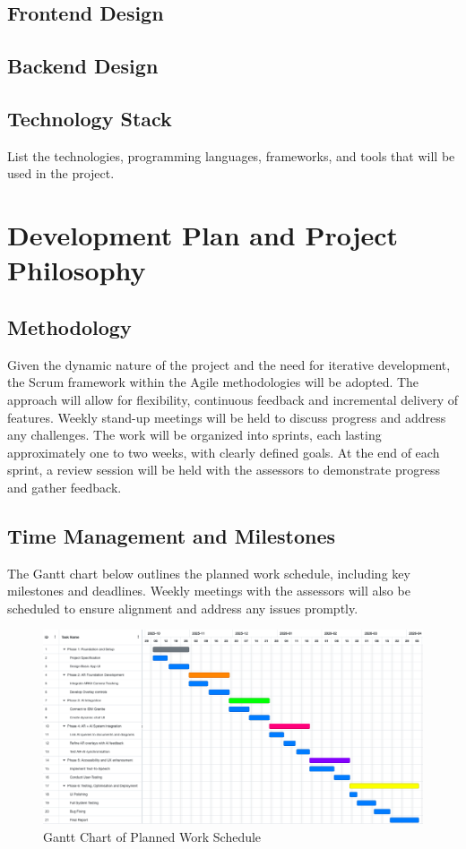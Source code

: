 \documentclass[12pt]{article}
\begin{document}
    \subsection{Frontend Design}

    \subsection{Backend Design}

    \subsection{Technology Stack}
    List the technologies, programming languages, frameworks, and tools that will be used in the project.

\section{Development Plan and Project Philosophy}

    \subsection{Methodology}

    Given the dynamic nature of the project and the need for iterative development, the Scrum framework within the Agile methodologies will be adopted. The approach will allow for flexibility, continuous feedback
    and incremental delivery of features. Weekly stand-up meetings will be held to discuss progress and address any challenges. The work will be organized into sprints, each lasting approximately one to two weeks,
    with clearly defined goals. At the end of each sprint, a review session will be held with the assessors to demonstrate progress and gather feedback.

    \subsection{Time Management and Milestones}
        The Gantt chart below outlines the planned work schedule, including key milestones and deadlines. Weekly meetings with the assessors will also be scheduled to ensure alignment and address any issues promptly.

        \begin{figure}[H]
        \centering
        \includegraphics[width=\textwidth]{GanttChart.png}
        \caption{Gantt Chart of Planned Work Schedule}
        \label{fig:GanttChart}
        \end{figure}
\end{document}
